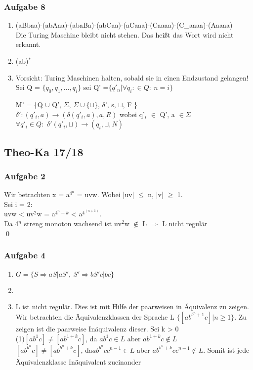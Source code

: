 \documentclass[12pt]{scrartcl}
\begin{document}
\subsubsection{Aufgabe 8}
	\begin{enumerate}
			\item (aBbaa)-(abAaa)-(abaBa)-(abCaa)-(aCaaa)-(Caaaa)-(C\_aaaa)-(Aaaaa) \\
			Die Turing Maschine bleibt nicht stehen. Das heißt das Wort wird nicht erkannt.
			\item (ab)$^{*}$
			\item Vorsicht: Turing Maschinen halten, sobald sie in einen Endzustand gelangen! \\
			Sei Q = \(\{q_0, q_1, ..., q_i\}\) sei Q' =\(\{ q'_n | \forall q_i:\in Q:\ n = i \}\)
			
			M' = \{Q $\cup$ Q', $\Sigma$, $\Sigma \cup \{ \sqcup \}$, $\delta$', s, $\sqcup$, F \} \\
			\(\delta':  (q'_i, a) \rightarrow (\delta(q'_i, a),a, R) \) wobei q'$_i$ $\in$ Q', a $\in \Sigma$  \\
			$\forall q'_i \in Q:$ \(\delta'(q'_i, \sqcup) \rightarrow (q_i, \sqcup,N)\)
	\end{enumerate}
	
\subsection{Theo-Ka 17/18}
	
\subsubsection{Aufgabe 2}
	Wir betrachten x = a$^{4{^n}}$ = uvw. Wobei |uv| $\le$ n, |v| $\ge$ 1. \\
	Sei i = 2:\\
	uvw < uv$^{2}$w = a$^{4^{n}+k}$ <  a$^{4^{(n+1)}}$. \\
	Da 4$^{n}$ streng monoton wachsend ist uv$^{2}$w $\notin$ L $\Rightarrow$ L nicht regulär \\
	\qed

\subsubsection{Aufgabe 4}
	\begin{enumerate}
		\item \(G = \{ S \Rightarrow aS| aS',\ S' \Rightarrow bS'c|bc\}\)
		\item
		\item L ist nicht regulär. Dies ist mit Hilfe der paarweisen in Äquivalenz zu zeigen.\\
		Wir betrachten die Äquivalenzklassen der Sprache L \(\{ [ab^{b^n+1}c]| n \ge 1 \}\). Zu zeigen ist die paarweise Inäquivalenz dieser. Sei k > 0\\
		(1)\( [ab^{1}c] \neq [ab^{1+k}c]\), da \(ab^{1}c \in L\) aber \(ab^{1+k}c \notin L\) \\
		\( [ab^{b^n}c] \neq [ab^{b^n+k}c]\), da\( ab^{b^n}cc^{n-1} \in L\) aber \( ab^{b^n+k}cc^{n-1} \notin L\). Somit ist jede Äquivalenzklasse Inäquivalent zueinander 
	\end{enumerate}
	
\end{document}
